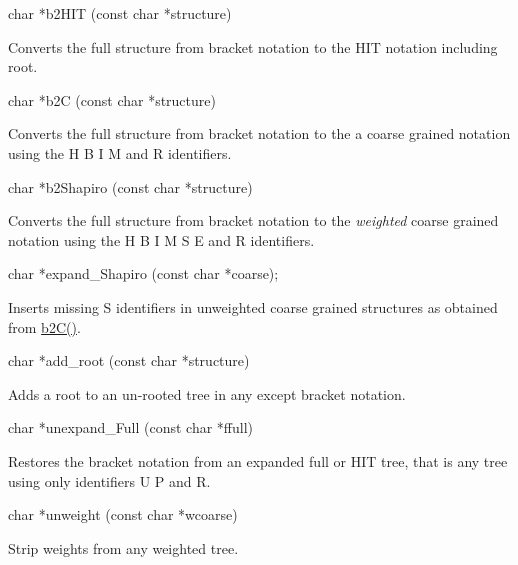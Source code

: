 \begin{DoxyVerb}char *b2HIT (const char *structure)
\end{DoxyVerb}
 Converts the full structure from bracket notation to the H\+IT notation including root.

\begin{DoxyVerb}char *b2C (const char *structure)
\end{DoxyVerb}
 Converts the full structure from bracket notation to the a coarse grained notation using the \textquotesingle{}H\textquotesingle{} \textquotesingle{}B\textquotesingle{} \textquotesingle{}I\textquotesingle{} \textquotesingle{}M\textquotesingle{} and \textquotesingle{}R\textquotesingle{} identifiers.

\begin{DoxyVerb}char *b2Shapiro (const char *structure)
\end{DoxyVerb}
 Converts the full structure from bracket notation to the {\itshape weighted} coarse grained notation using the \textquotesingle{}H\textquotesingle{} \textquotesingle{}B\textquotesingle{} \textquotesingle{}I\textquotesingle{} \textquotesingle{}M\textquotesingle{} \textquotesingle{}S\textquotesingle{} \textquotesingle{}E\textquotesingle{} and \textquotesingle{}R\textquotesingle{} identifiers.

\begin{DoxyVerb}char  *expand_Shapiro (const char *coarse);
\end{DoxyVerb}
 Inserts missing \textquotesingle{}S\textquotesingle{} identifiers in unweighted coarse grained structures as obtained from \hyperlink{group__struct__utils_ga9c80d92391f2833549a8b6dac92233f0}{b2\+C()}.

\begin{DoxyVerb}char *add_root (const char *structure)
\end{DoxyVerb}
 Adds a root to an un-\/rooted tree in any except bracket notation.

\begin{DoxyVerb}char  *unexpand_Full (const char *ffull)
\end{DoxyVerb}
 Restores the bracket notation from an expanded full or H\+IT tree, that is any tree using only identifiers \textquotesingle{}U\textquotesingle{} \textquotesingle{}P\textquotesingle{} and \textquotesingle{}R\textquotesingle{}.

\begin{DoxyVerb}char  *unweight (const char *wcoarse)
\end{DoxyVerb}
 Strip weights from any weighted tree.

